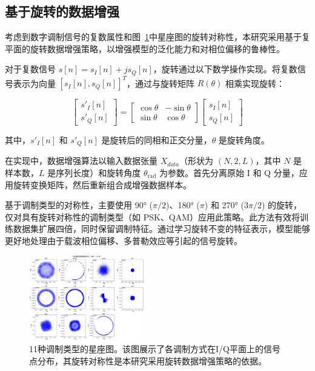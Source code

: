 \documentclass[conference]{IEEEtran}
\begin{document}
\subsection{基于旋转的数据增强}


考虑到数字调制信号的复数属性和图~\ref{fig:constellation}中星座图的旋转对称性，本研究采用基于复平面的旋转数据增强策略，以增强模型的泛化能力和对相位偏移的鲁棒性。

对于复数信号 \(s[n] = s_I[n] + j s_Q[n]\)，旋转通过以下数学操作实现。将复数信号表示为向量 \([s_I[n], s_Q[n]]^T\)，通过与旋转矩阵 \(R(\theta)\) 相乘实现旋转：

\begin{equation}
\begin{bmatrix} s'_I[n] \\ s'_Q[n] \end{bmatrix} = \begin{bmatrix} \cos\theta & -\sin\theta \\ \sin\theta & \cos\theta \end{bmatrix} \begin{bmatrix} s_I[n] \\ s_Q[n] \end{bmatrix}
\end{equation}

其中，\(s'_I[n]\) 和 \(s'_Q[n]\) 是旋转后的同相和正交分量，\(\theta\) 是旋转角度。

在实现中，数据增强算法以输入数据张量 \(X_{data}\)（形状为 \((N, 2, L)\)，其中 \(N\) 是样本数，\(L\) 是序列长度）和旋转角度 \(\theta_{\text{rad}}\) 为参数。首先分离原始 I 和 Q 分量，应用旋转变换矩阵，然后重新组合成增强数据样本。

基于调制类型的对称性，主要使用 90° (\(\pi/2\))、180° (\(\pi\)) 和 270° (\(3\pi/2\)) 的旋转，仅对具有旋转对称性的调制类型（如 PSK、QAM）应用此策略。此方法有效将训练数据集扩展四倍，同时保留调制特征。通过学习旋转不变的特征表示，模型能够更好地处理由于载波相位偏移、多普勒效应等引起的信号旋转。

\begin{figure}[htbp]
\centering
\includegraphics[width=0.45\textwidth]{figure/constellation.png}
\caption{11种调制类型的星座图。该图展示了各调制方式在I/Q平面上的信号点分布，其旋转对称性是本研究采用旋转数据增强策略的依据。}
\label{fig:constellation}
\end{figure}
\end{document}
